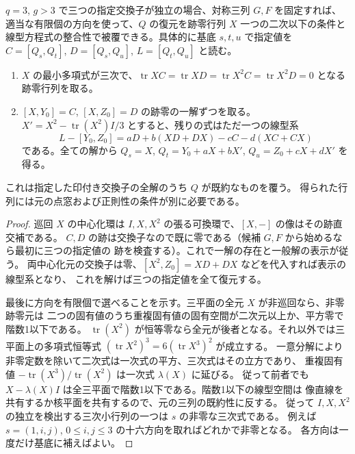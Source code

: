 \begin{proposition}\label{prop:marked-three-commutators-reconstruction}
$q=3$, $g>3$ で三つの指定交換子が独立の場合、対称三列 $G,F$ を固定すれば、
適当な有限個の方向を使って、$Q$ の復元を跡零行列 $X$ 一つの二次以下の条件と
線型方程式の整合性で被覆できる。具体的に基底 $s,t,u$ で指定値を
$C=[Q_s,Q_t]$, $D=[Q_s,Q_u]$, $L=[Q_t,Q_u]$ と読む。
\begin{enumerate}
\item $X$ の最小多項式が三次で、$\operatorname{tr}XC=\operatorname{tr}XD
=\operatorname{tr}X^2 C=\operatorname{tr}X^2 D=0$ となる跡零行列を取る。
\item $[X,Y_0]=C$, $[X,Z_0]=D$ の跡零の一解ずつを取る。
$X'=X^2-\operatorname{tr}(X^2)I/3$ とすると、残りの式はただ一つの線型系
\[
 L-[Y_0,Z_0]= aD+b(XD+DX)-cC-d(XC+CX)
\]
である。全ての解から $Q_s=X$, $Q_t=Y_0+aX+bX'$, $Q_u=Z_0+cX+dX'$ を得る。
\end{enumerate}
これは指定した印付き交換子の全解のうち $Q$ が既約なものを覆う。
得られた行列には元の点窓および正則性の条件が別に必要である。
\end{proposition}
\begin{proof}
巡回 $X$ の中心化環は $I,X,X^2$ の張る可換環で、$[X,-]$ の像はその跡直交補である。
$C,D$ の跡は交換子なので既に零である（候補 $G,F$ から始めるなら最初に三つの指定値の
跡を検査する）。これで一解の存在と一般解の表示が従う。
両中心化元の交換子は零、$[X^2,Z_0]=XD+DX$ などを代入すれば表示の線型系となり、
これを解けば三つの指定値を全て復元する。

最後に方向を有限個で選べることを示す。三平面の全元 $X$ が非巡回なら、非零跡零元は
二つの固有値のうち重複固有値の固有空間が二次元以上か、平方零で階数1以下である。
$\operatorname{tr}(X^2)$ が恒等零なら全元が後者となる。それ以外では三平面上の多項式恒等式
$(\operatorname{tr}X^2)^3=6(\operatorname{tr}X^3)^2$ が成立する。
一意分解により非零定数を除いて二次式は一次式の平方、三次式はその立方であり、
重複固有値 $-\operatorname{tr}(X^3)/\operatorname{tr}(X^2)$ は一次式 $\lambda(X)$ に延びる。
従って前者でも $X-\lambda(X)I$ は全三平面で階数1以下である。階数1以下の線型空間は
像直線を共有するか核平面を共有するので、元の三列の既約性に反する。
従って $I,X,X^2$ の独立を検出する三次小行列の一つは $s$ の非零な三次式である。
例えば $s=(1,i,j)$, $0\le i,j\le3$ の十六方向を取ればどれかで非零となる。
各方向は一度だけ基底に補えばよい。
\end{proof}
